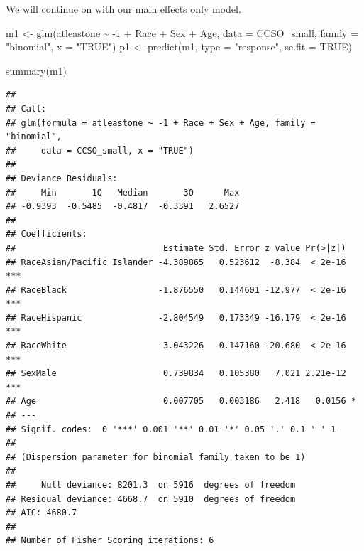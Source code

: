 \documentclass[
  ignorenonframetext,
]{beamer}
\newenvironment{Shaded}{\begin{snugshade}}{\end{snugshade}}
\newcommand{\AttributeTok}[1]{\textcolor[rgb]{0.77,0.63,0.00}{#1}}
\newcommand{\ConstantTok}[1]{\textcolor[rgb]{0.00,0.00,0.00}{#1}}
\newcommand{\DecValTok}[1]{\textcolor[rgb]{0.00,0.00,0.81}{#1}}
\newcommand{\FunctionTok}[1]{\textcolor[rgb]{0.00,0.00,0.00}{#1}}
\newcommand{\NormalTok}[1]{#1}
\newcommand{\OtherTok}[1]{\textcolor[rgb]{0.56,0.35,0.01}{#1}}
\newcommand{\SpecialCharTok}[1]{\textcolor[rgb]{0.00,0.00,0.00}{#1}}
\newcommand{\StringTok}[1]{\textcolor[rgb]{0.31,0.60,0.02}{#1}}
\begin{document}
\begin{frame}[fragile]{}
\protect\hypertarget{section-1}{}
We will continue on with our main effects only model.

\vspace{12pt}
\tiny

\begin{Shaded}
\begin{Highlighting}[]
\NormalTok{m1 }\OtherTok{\textless{}{-}} \FunctionTok{glm}\NormalTok{(atleastone }\SpecialCharTok{\textasciitilde{}} \SpecialCharTok{{-}}\DecValTok{1} \SpecialCharTok{+}\NormalTok{ Race }\SpecialCharTok{+}\NormalTok{ Sex }\SpecialCharTok{+}\NormalTok{ Age, }\AttributeTok{data =}\NormalTok{ CCSO\_small, }
          \AttributeTok{family =} \StringTok{"binomial"}\NormalTok{, }\AttributeTok{x =} \StringTok{"TRUE"}\NormalTok{)}
\NormalTok{p1 }\OtherTok{\textless{}{-}} \FunctionTok{predict}\NormalTok{(m1, }\AttributeTok{type =} \StringTok{"response"}\NormalTok{, }\AttributeTok{se.fit =} \ConstantTok{TRUE}\NormalTok{)}

\FunctionTok{summary}\NormalTok{(m1)}
\end{Highlighting}
\end{Shaded}

\begin{verbatim}
## 
## Call:
## glm(formula = atleastone ~ -1 + Race + Sex + Age, family = "binomial", 
##     data = CCSO_small, x = "TRUE")
## 
## Deviance Residuals: 
##     Min       1Q   Median       3Q      Max  
## -0.9393  -0.5485  -0.4817  -0.3391   2.6527  
## 
## Coefficients:
##                             Estimate Std. Error z value Pr(>|z|)    
## RaceAsian/Pacific Islander -4.389865   0.523612  -8.384  < 2e-16 ***
## RaceBlack                  -1.876550   0.144601 -12.977  < 2e-16 ***
## RaceHispanic               -2.804549   0.173349 -16.179  < 2e-16 ***
## RaceWhite                  -3.043226   0.147160 -20.680  < 2e-16 ***
## SexMale                     0.739834   0.105380   7.021 2.21e-12 ***
## Age                         0.007705   0.003186   2.418   0.0156 *  
## ---
## Signif. codes:  0 '***' 0.001 '**' 0.01 '*' 0.05 '.' 0.1 ' ' 1
## 
## (Dispersion parameter for binomial family taken to be 1)
## 
##     Null deviance: 8201.3  on 5916  degrees of freedom
## Residual deviance: 4668.7  on 5910  degrees of freedom
## AIC: 4680.7
## 
## Number of Fisher Scoring iterations: 6
\end{verbatim}
\end{frame}
\end{document}
